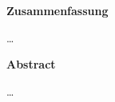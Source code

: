 \label{sec:abstract}
    \begin{center}
      \textbf{Zusammenfassung}
    \end{center}
    \ldots
\vspace{4em}
    \begin{otherlanguage}{english}
        \begin{center}
          \textbf{Abstract}
        \end{center}
        \ldots
    \end{otherlanguage}